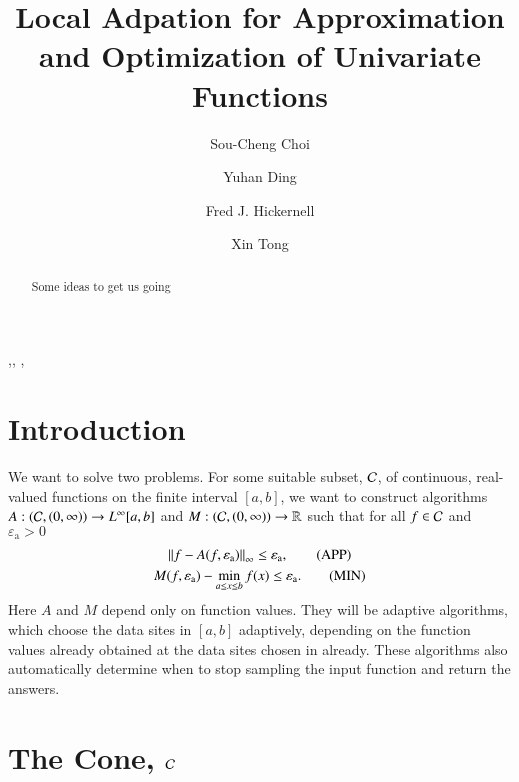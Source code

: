 \documentclass[review]{elsarticle}
\newcommand{\abstol}{\varepsilon_{\textrm{a}}}
\theoremstyle{definition}
\begin{document}
\begin{frontmatter}

\title{Local Adpation for Approximation and Optimization of Univariate Functions}


\author{Sou-Cheng Choi}
\author{Yuhan Ding}
\author{Fred J. Hickernell}
\author{Xin Tong}
\address{Department of Applied Mathematics, Illinois Institute of Technology, RE 208, 10 West 32$^{\text{nd}}$ Street, Chicago, Illinois, 60616, USA}

\begin{abstract}
Some ideas to get us going
\end{abstract}

\begin{keyword}
\sep \sep
\MSC[2010]  \sep
\end{keyword}

\end{frontmatter}

\section{Introduction} \label{sec:intro}

We want to solve two problems. For some suitable subset, $\mathcal{C}$, of continuous,
real-valued functions on the finite interval $[a,b]$, we want to construct
algorithms $A:(\mathcal{C},(0,\infty)) \to L^{\infty}[a,b]$ and $M: (\mathcal{C},(0,\infty)) \to
\mathbb{R}$ such that for all $f \in \mathcal{C}$ and $\abstol > 0$
\begin{gather}
\norm[\infty]{f - A(f,\abstol)} \le \abstol,  \tag{APP} \label{appxprob} \\
M(f,\abstol) - \min_{a \le x \le b} f(x)  \le \abstol. \tag{MIN} \label{optprob}
\end{gather}
Here $A$ and $M$ depend only on function values. They will be adaptive
algorithms, which choose the data sites in $[a,b]$ adaptively, depending on the
function values already obtained at the data sites chosen in already. These
algorithms also automatically determine when to stop sampling the input function
and return the answers.



\section{The Cone, $\mathcal{C}$} \label{sec:cone}
\end{document}
